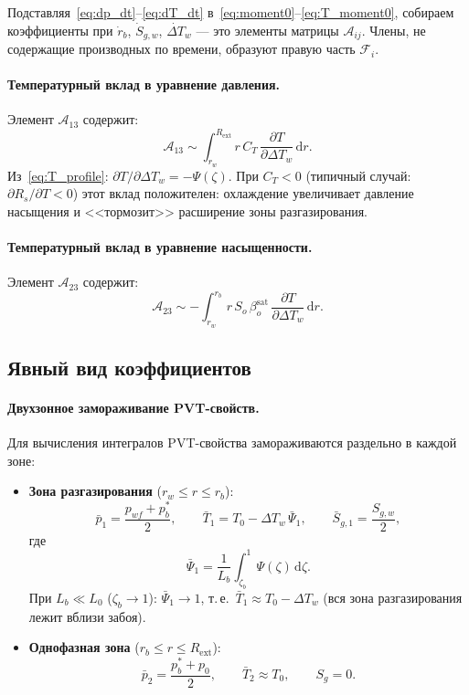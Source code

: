 \documentclass[12pt,a4paper]{article}
\newcommand{\dd}{\mathrm{d}}
\newcommand{\pp}{\partial}
\newcommand{\ext}{\mathrm{ext}}
\newcommand{\sat}{\mathrm{sat}}
\begin{document}
Подставляя~\eqref{eq:dp_dt}--\eqref{eq:dT_dt}
в~\eqref{eq:moment0}--\eqref{eq:T_moment0}, собираем
коэффициенты при $\dot{r}_b$, $\dot{S}_{g,w}$,
$\dot{\Delta T}_w$ --- это элементы матрицы
$\mathcal{A}_{ij}$. Члены, не содержащие производных
по времени, образуют правую часть $\mathcal{F}_i$.

\paragraph{Температурный вклад в уравнение давления.}
Элемент $\mathcal{A}_{13}$ содержит:
\[
  \mathcal{A}_{13} \sim \int_{r_w}^{R_\ext} r\,C_T\,
    \frac{\pp T}{\pp \Delta T_w}\,\dd r.
\]
Из~\eqref{eq:T_profile}: $\pp T/\pp \Delta T_w = -\Psi(\zeta)$.
При $C_T < 0$ (типичный случай: $\pp R_s/\pp T < 0$)
этот вклад положителен: охлаждение увеличивает
давление насыщения и <<тормозит>> расширение зоны разгазирования.

\paragraph{Температурный вклад в уравнение насыщенности.}
Элемент $\mathcal{A}_{23}$ содержит:
\[
  \mathcal{A}_{23} \sim -\int_{r_w}^{r_b} r\,S_o\,\beta_o^\sat\,
    \frac{\pp T}{\pp \Delta T_w}\,\dd r.
\]


\subsection{Явный вид коэффициентов}

\paragraph{Двухзонное замораживание PVT-свойств.}
Для вычисления интегралов PVT-свойства замораживаются
раздельно в каждой зоне:
\begin{itemize}[nosep]
  \item \textbf{Зона разгазирования} ($r_w \leqslant r \leqslant r_b$):
        \[
          \bar{p}_1 = \frac{p_{wf} + p_b^*}{2}, \qquad
          \bar{T}_1 = T_0 - \Delta T_w\,\bar{\Psi}_1,
          \qquad
          \bar{S}_{g,1} = \frac{S_{g,w}}{2},
        \]
        где
        \[
          \bar{\Psi}_1
          = \frac{1}{L_b}\int_{\zeta_b}^{1}\Psi(\zeta)\,\dd\zeta.
        \]
        При $L_b \ll L_0$ ($\zeta_b \to 1$):
        $\bar{\Psi}_1 \to 1$, т.\,е.\ $\bar{T}_1 \approx T_0 - \Delta T_w$
        (вся зона разгазирования лежит вблизи забоя).
  \item \textbf{Однофазная зона} ($r_b \leqslant r \leqslant R_\ext$):
        \[
          \bar{p}_2 = \frac{p_b^* + p_0}{2}, \qquad
          \bar{T}_2 \approx T_0, \qquad
          S_g = 0.
        \]
\end{itemize}
\end{document}
